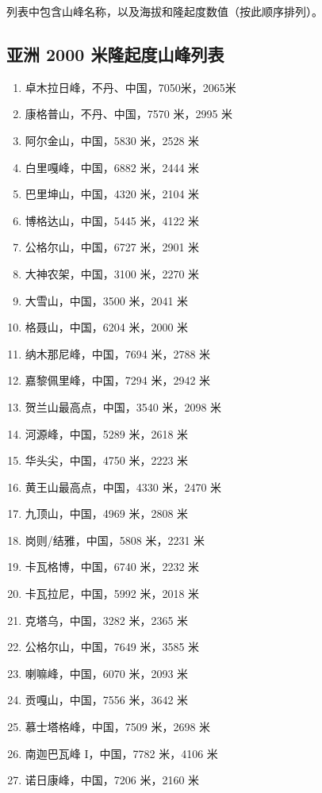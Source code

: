 \documentclass[10pt,twocolumn,letterpaper]{article}
\begin{document}
列表中包含山峰名称，以及海拔和隆起度数值（按此顺序排列）。
\subsection{亚洲 2000 米隆起度山峰列表}
\begin{flushleft}
\begin{enumerate}
    \item 卓木拉日峰，不丹、中国，7050米，2065米
    \item 康格普山，不丹、中国，7570 米，2995 米
    \item 阿尔金山，中国，5830 米，2528 米
    \item 白里嘎峰，中国，6882 米，2444 米
    \item 巴里坤山，中国，4320 米，2104 米
    \item 博格达山，中国，5445 米，4122 米
    \item 公格尔山，中国，6727 米，2901 米
    \item 大神农架，中国，3100 米，2270 米
    \item 大雪山，中国，3500 米，2041 米
    \item 格聂山，中国，6204 米，2000 米
    \item 纳木那尼峰，中国，7694 米，2788 米
    \item 嘉黎佩里峰，中国，7294 米，2942 米
    \item 贺兰山最高点，中国，3540 米，2098 米
    \item 河源峰，中国，5289 米，2618 米
    \item 华头尖，中国，4750 米，2223 米
    \item 黄王山最高点，中国，4330 米，2470 米
    \item 九顶山，中国，4969 米，2808 米
    \item 岗则/结雅，中国，5808 米，2231 米
    \item 卡瓦格博，中国，6740 米，2232 米
    \item 卡瓦拉尼，中国，5992 米，2018 米
    \item 克塔乌，中国，3282 米，2365 米
    \item 公格尔山，中国，7649 米，3585 米
    \item 喇嘛峰，中国，6070 米，2093 米
    \item 贡嘎山，中国，7556 米，3642 米
    \item 慕士塔格峰，中国，7509 米，2698 米
    \item 南迦巴瓦峰 I，中国，7782 米，4106 米
    \item 诺日康峰，中国，7206 米，2160 米

\end{enumerate}
\end{flushleft}
\end{document}
